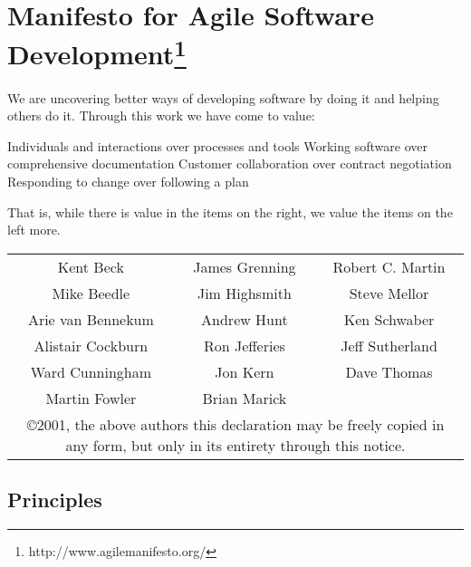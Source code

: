 \documentclass[]{article}
\begin{document}
\section*{Manifesto for Agile Software Development\footnote{http://www.agilemanifesto.org/}}

We are uncovering better ways of developing
software by doing it and helping others do it.
Through this work we have come to value:

Individuals and interactions over processes and tools
Working software over comprehensive documentation
Customer collaboration over contract negotiation
Responding to change over following a plan

That is, while there is value in the items on
the right, we value the items on the left more.

\begin{center}
\tiny
\begin{tabular}{c c c}
Kent Beck & James Grenning & Robert C. Martin \\
Mike Beedle & Jim Highsmith & Steve Mellor \\
Arie van Bennekum & Andrew Hunt & Ken Schwaber \\
Alistair Cockburn & Ron Jefferies & Jeff Sutherland \\
Ward Cunningham & Jon Kern & Dave Thomas \\
Martin Fowler & Brian Marick & \\ 
\multicolumn{3}{p{7.0cm}}{ \vspace{3mm}
\copyright 2001, the above authors
this declaration may be freely copied in any form, 
but only in its entirety through this notice. }
\end{tabular}
\end{center}
\normalsize


\subsection*{Principles}
\end{document}
